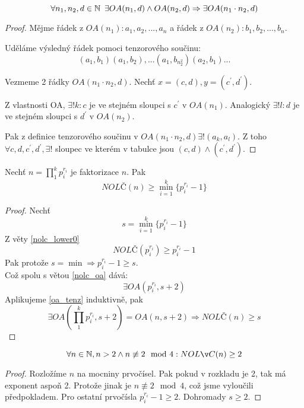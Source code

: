 \begin{theorem}\label{oa_tenz}
	\[ \forall n_1,n_2,d \in \operatorname{\mathbb{N}} \ \exists OA(n_1, d) \land OA(n_2, d) \Rightarrow \exists OA(n_1 \cdot n_2, d) \]
\end{theorem}
\begin{proof}
	Mějme řádek z $OA(n_1): a_1, a_2, ..., a_n$ a řádek z $OA(n_2): b_1, b_2, ..., b_n$.

	Uděláme výsledný řádek pomoci tenzorového součinu:
	\[ (a_1, b_1) (a_1, b_2), ...(a_1, b_{n_2^2})(a_2, b_1) ... \]

	Vezmeme 2 řádky $OA(n_1 \cdot n_2, d)$.
	Nechť $x = (c, d), y = (c^{\prime}, d^{\prime})$.

	Z vlastnosti OA, $\exists! k: c$ je ve stejném sloupci s $c^{\prime}$ v $OA(n_1)$.
	Analogický $\exists! l: d$ je ve stejném sloupci s $d^{\prime}$ v $OA(n_2)$.

	Pak z definice tenzorového součinu v $OA(n_1 \cdot n_2, d) \exists ! (a_k, a_l)$.
	Z toho
	$ \forall c, d, c^{\prime}, d^{\prime}, \exists !$ sloupec ve kterém v tabulce jsou $(c, d) \land (c^{\prime}, d^{\prime})$.
\end{proof}

\begin{theorem}\label{nolc_lower_0}
	Nechť $n = \prod_1^k p_i^{r_i}$ je faktorizace $n$. Pak
	\[ NOLČ(n) \geq \min_{i = 1}^k \{ p_i^{r_i} - 1 \}  \]
\end{theorem}
\begin{proof}
	Nechť \[ s = \min_{i = 1}^k \{ p_i^{r_i} - 1 \} \]
	Z věty \cref{nolc_lower0}
	\[ NOLČ(p_i^{r_i}) \geq p_i^{r_i} - 1 \]
	Pak protože $s = \min \Rightarrow p_i^{r_i} - 1 \geq s$.\\
	Což spolu s větou \cref{nolc_oa} dává:
	\[ \exists OA(p_i^{r_i}, s + 2) \]
	Aplikujeme \cref{oa_tenz} induktivně, pak
	\[ \exists OA(\prod_1^k p_i^{r_i}, s + 2) = OA(n, s + 2) \Rightarrow NOLČ(n) \geq s \]
\end{proof}

\begin{consequence}\label{nolc_lower_1}
	\[ \forall n \in \N, n > 2 \land n \not\equiv 2 \mod 4: NOLČ(n) \geq 2 \]
\end{consequence}
\begin{proof}
	Rozložíme $n$ na mocniny prvočísel. Pak pokud v rozkladu je 2, tak má exponent aspoň 2.
	Protože jinak je $n \not\equiv 2 \mod 4$, což jsme vyloučili předpokladem.
	Pro ostatní prvočísla $p_i^{r_i} - 1 \geq 2$.
	Dohromady $s \geq 2$.
\end{proof}

